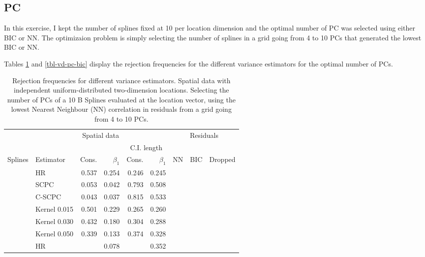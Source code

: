 \documentclass[
]{article}
\begin{document}
\hypertarget{pc}{%
\subsection{PC}\label{pc}}

In this exercise, I kept the number of splines fixed at 10 per location
dimension and the optimal number of PC was selected using either BIC or
NN. The optimizaion problem is simply selecting the number of splines in
a grid going from 4 to 10 PCs that generated the lowest BIC or NN.

Tables \ref{tbl-vd-bic-nn} and \ref{tbl-vd-pc-bic} display the rejection
frequencies for the different variance estimators for the optimal number
of PCs.
\newpage
\hypertarget{tbl-vd-bic-nn}{}
\begin{longtable}[t]{llrrrrrrr}
\caption{\label{tbl-vd-bic-nn}Rejection frequencies for different variance estimators. Spatial data
with independent uniform-distributed two-dimension locations. Selecting
the number of PCs of a 10 B Splines evaluated at the location vector,
using the lowest Nearest Neighbour (NN) correlation in residuals from a
grid going from 4 to 10 PCs. }\tabularnewline

\toprule
\multicolumn{1}{c}{ } & \multicolumn{5}{c}{Spatial data} & \multicolumn{3}{c}{Residuals} \\
\cmidrule(l{3pt}r{3pt}){2-6} \cmidrule(l{3pt}r{3pt}){7-9}
\multicolumn{4}{c}{ } & \multicolumn{2}{c}{C.I. length} \\
\cmidrule(l{3pt}r{3pt}){5-6}
Splines & Estimator & Cons. & $\beta_1$ & Cons.  & $\beta_1$  & NN & BIC & Dropped\\
\midrule
 & HR & 0.537 & 0.254 & 0.246 & 0.245 &  &  & \\

 & SCPC & 0.053 & 0.042 & 0.793 & 0.508 &  &  & \\

 & C-SCPC & 0.043 & 0.037 & 0.815 & 0.533 &  &  & \\

 & Kernel 0.015 & 0.501 & 0.229 & 0.265 & 0.260 &  &  & \\

 & Kernel 0.030 & 0.432 & 0.180 & 0.304 & 0.288 &  &  & \\

\multirow[t]{-6}{*}{\raggedright\arraybackslash } & Kernel 0.050 & 0.339 & 0.133 & 0.374 & 0.328 & \multirow[t]{-6}{*}{\raggedleft\arraybackslash 0.626} & \multirow[t]{-6}{*}{\raggedleft\arraybackslash 711.648} & \multirow[t]{-6}{*}{\raggedleft\arraybackslash }\\
\cmidrule{1-9}
 & HR &  & 0.078 &  & 0.352 &  &  & \\


\end{longtable}
\end{document}
